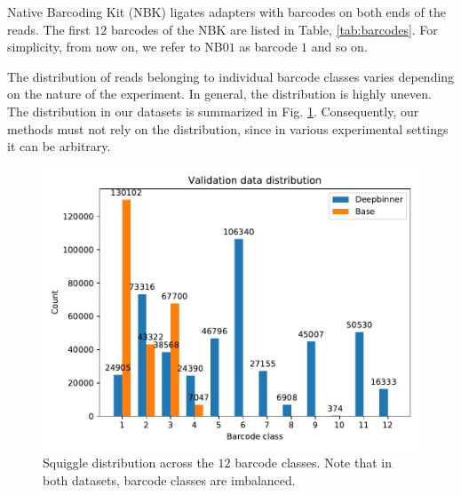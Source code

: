 Native Barcoding Kit (NBK) ligates adapters with barcodes on both ends of the reads. The first $12$ barcodes of the NBK are listed in Table, \ref{tab:barcodes}. For simplicity, from now on, we refer to NB$01$ as barcode $1$ and so on.

The distribution of reads belonging to individual barcode classes varies depending on the nature of the experiment. In general, the distribution is highly uneven. The distribution in our datasets is summarized in Fig.  \ref{fig:barcodes_distribution}.  Consequently, our methods must not rely on the distribution, since in various experimental settings it can be arbitrary.


\begin{figure}
    \centering
    \includegraphics[scale=0.8]{images/dataset_distribution.pdf}
    \caption[Squiggle distributions across both datasets]{Squiggle distribution across the $12$ barcode classes. Note that in both datasets, barcode classes are imbalanced.}
    \label{fig:barcodes_distribution}
\end{figure}


